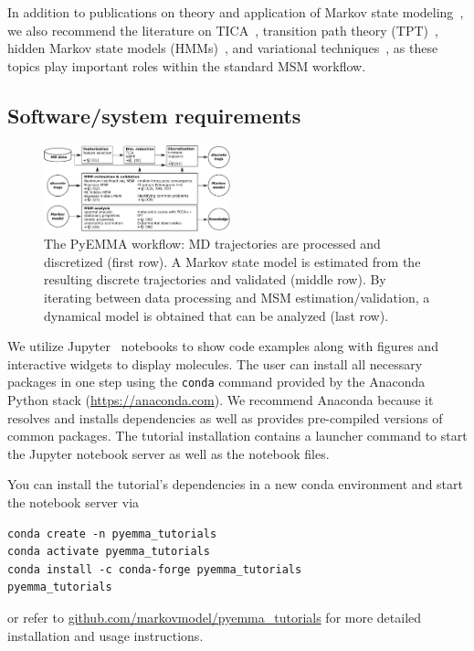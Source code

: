 \documentclass[9pt,tutorial]{livecoms}
\newcommand{\githubrepository}{\url{github.com/markovmodel/pyemma_tutorials}}
\begin{document}
In addition to publications on theory and application of Markov state modeling~\cite{schuette-msm,buchete-msm-2008,noe-tmat-sampling,bowman-msm-2009,noe-folding-pathways,sarich-msm-quality,noe-fingerprints,noe-dy-neut-scatt,Chodera2014,ben-rev-msm,simon-mech-mod-nmr,oom-feliks,simon-amm},
we also recommend the literature on TICA~\cite{tica,tica3,tica2,kinetic-maps}, transition path theory (TPT)~\cite{weinan-tpt,metzner-msm-tpt},
hidden Markov state models (HMMs)~\cite{noe-proj-hid-msm,hmm-baum-welch-alg,hmm-tutorial}, and variational techniques~\cite{noe-vac,vamp-preprint,gmrq}, as these topics play important roles within the standard MSM workflow.

\subsection{Software/system requirements}

\begin{figure}
\includegraphics[width=0.48\textwidth]{figure_1}
\caption{The PyEMMA workflow: MD trajectories are processed and discretized (first row). A Markov state model is estimated from the resulting discrete trajectories and validated (middle row). By iterating between data processing and MSM estimation/validation, a dynamical model is obtained that can be analyzed (last row).}
\label{fig:workflowchart}
\end{figure}

We utilize Jupyter~\cite{jupyter} notebooks to show code examples along with figures and interactive widgets to display molecules.
The user can install all necessary packages in one step using the \texttt{conda} command provided by the Anaconda Python stack (\url{https://anaconda.com}).
We recommend Anaconda because it resolves and installs dependencies as well as provides pre-compiled versions of common packages.
The tutorial installation contains a launcher command to start the Jupyter notebook server as well as the notebook files.

You can install the tutorial's dependencies in a new conda environment and start the notebook server via
\begin{verbatim}
conda create -n pyemma_tutorials
conda activate pyemma_tutorials
conda install -c conda-forge pyemma_tutorials
pyemma_tutorials
\end{verbatim}
or refer to \githubrepository{} for more detailed installation and usage instructions.
\end{document}
